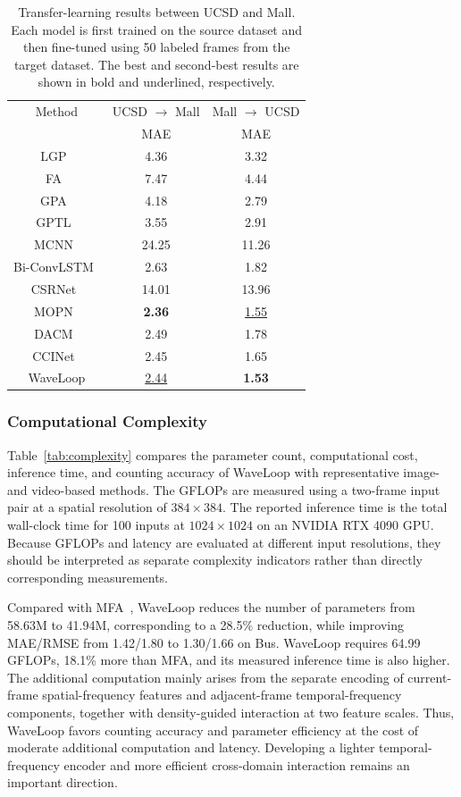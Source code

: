 \documentclass[lettersize,journal]{IEEEtran}
\begin{document}
\begin{table}[t]
\caption{Transfer-learning results between UCSD and Mall. Each model is first trained on the source dataset and then fine-tuned using 50 labeled frames from the target dataset. The best and second-best results are shown in bold and underlined, respectively.}
\centering
\scriptsize
\begin{tabular}{ccc}
\toprule
Method & UCSD $\rightarrow$ Mall & Mall $\rightarrow$ UCSD \\
 & MAE & MAE \\
\midrule
LGP~\cite{yu2005learning} & 4.36 & 3.32 \\
FA~\cite{change2013semi} & 7.47 & 4.44 \\
GPA~\cite{liu2015bayesian} & 4.18 & 2.79 \\
GPTL~\cite{liu2015bayesian} & 3.55 & 2.91 \\
MCNN~\cite{zhang2016single} & 24.25 & 11.26 \\
Bi-ConvLSTM~\cite{xiong2017spatiotemporal} & 2.63 & 1.82 \\
CSRNet~\cite{li2018csrnet} & 14.01 & 13.96 \\
MOPN~\cite{hossain2020video} & \textbf{2.36} & \underline{1.55} \\
DACM~\cite{ling2025dual} & 2.49 & 1.78 \\
CCINet~\cite{ling2026cascaded} & 2.45 & 1.65 \\
\midrule
WaveLoop & \underline{2.44} & \textbf{1.53} \\
\bottomrule
\end{tabular}
\label{tab:cross_dataset}
\end{table}

\subsubsection{Computational Complexity}
Table~\ref{tab:complexity} compares the parameter count, computational cost, inference time, and counting accuracy of WaveLoop with representative image- and video-based methods. The GFLOPs are measured using a two-frame input pair at a spatial resolution of $384\times384$. The reported inference time is the total wall-clock time for 100 inputs at $1024\times1024$ on an NVIDIA RTX 4090 GPU. Because GFLOPs and latency are evaluated at different input resolutions, they should be interpreted as separate complexity indicators rather than directly corresponding measurements.

Compared with MFA~\cite{ling2023motional}, WaveLoop reduces the number of parameters from 58.63M to 41.94M, corresponding to a 28.5\% reduction, while improving MAE/RMSE from 1.42/1.80 to 1.30/1.66 on Bus. WaveLoop requires 64.99 GFLOPs, 18.1\% more than MFA, and its measured inference time is also higher. The additional computation mainly arises from the separate encoding of current-frame spatial-frequency features and adjacent-frame temporal-frequency components, together with density-guided interaction at two feature scales. Thus, WaveLoop favors counting accuracy and parameter efficiency at the cost of moderate additional computation and latency. Developing a lighter temporal-frequency encoder and more efficient cross-domain interaction remains an important direction.
\end{document}
